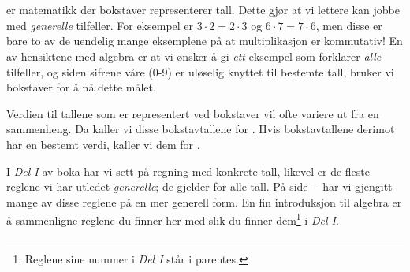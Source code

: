 




\section{\algintro}
 er matematikk der bokstaver representerer tall. Dette gjør at vi lettere kan jobbe med \textsl{generelle} tilfeller. For eksempel er $ {3\cdot 2=2\cdot3} $ og $ {6\cdot7=7\cdot6} $, men disse er bare to av de uendelig mange eksemplene på at multiplikasjon er kommutativ! En av hensiktene med algebra er at vi ønsker å gi \textsl{ett} eksempel som forklarer \textsl{alle} tilfeller, og siden sifrene våre (0-9) er uløselig knyttet til bestemte tall, bruker vi bokstaver for å nå dette målet. \vsk

Verdien til tallene som er representert ved bokstaver vil ofte variere ut fra en sammenheng. Da kaller vi disse bokstavtallene for . Hvis bokstavtallene derimot har en bestemt verdi, kaller vi dem for .

\vsk

I \textsl{Del I} av boka har vi sett på regning med konkrete tall, likevel er de fleste reglene vi har utledet \textsl{generelle}; de gjelder for alle tall. På side \pageref{regstart}\,-\,\pageref{regslutt} har vi gjengitt mange av disse reglene på en mer generell form. En fin introduksjon til algebra er å sammenligne reglene du finner her med slik du finner dem\footnote{Reglene sine nummer i \textsl{Del I} står i parentes.} i \textsl{Del I}. \vsk

\regv
\label{regstart}
\reg[\adkom\;(\ref{adkom}) \label{adkomalg}]{
\[ a+ b =b+a \]
}
\eks{ \vs
\[ 7+ 5=5+7 \]
} \vsk \vsk
\newpage
\reg[\gangkom\;(\ref{gangkom})]{
	\[ a\cdot b =b\cdot a \]
}
\eks[1]{ \vs
	\[ 9\cdot 8=8\cdot9 \]
}
\eks[2]{ \vs
\[  8\cdot a= a\cdot 8  \]
}

\vsk 

\reg[\brdef\;(\ref{brdef})]{
\[ a:b=\frac{a}{b} \]
}
\eks[]{ \vs
\[a:2= \frac{a}{2} \]
}

\newpage
\reg[\brtbr\; (\ref{brtbr})]{
\[ \frac{a}{b}\cdot\frac{c}{d}=\frac{a c}{b d} \]
}
\eks[2]{ \vs
	\[ \frac{3}{b}\cdot \frac{a}{7}=\frac{3 a}{7b} \]
} \vsk

